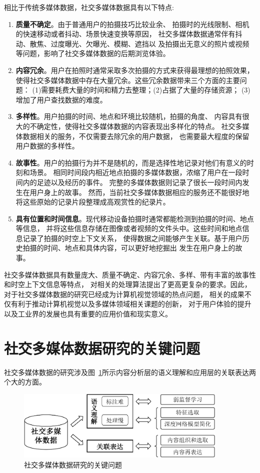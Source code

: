 \documentclass[doctor]{ustcthesis}
\begin{document}
相比于传统多媒体数据，社交多媒体数据具有以下特点:
\vspace{-0.2em}
\begin{enumerate}\setlength{\itemsep}{0pt}
    \item \textbf{质量不确定}。由于普通用户的拍摄技巧比较业余、
        拍摄时的光线限制、相机的快速移动或者抖动、场景快速变换等原因，
        社交多媒体数据通常伴有抖动、散焦、过度曝光、欠曝光、模糊、遮挡以
        及拍摄出无意义的照片或视频等问题，影响了社交多媒体数据的后期浏览体验。
    \item \textbf{内容冗余}。用户在拍照时通常采取多次拍摄的方式来获得最理想的拍照效果，
        使得社交多媒体数据中存在大量冗余。这些冗余数据带来三个方面的主要问题：
        (1)需要耗费大量的时间和精力去整理；(2)占据了大量的存储资源；
        (3)增加了用户查找数据的难度。
    \item \textbf{多样性}。用户拍摄的时间、地点和环境比较随机，拍摄的角度、
        内容具有很大的不确定性，使得社交多媒体数据的内容表现出多样化的特点。
        社交多媒体数据相关的服务，不仅需要去除冗余的用户数据，
        也需要最大程度的保留用户数据的多样性。
    \item \textbf{故事性}。用户的拍摄行为并不是随机的，而是选择性地记录对他们有意义的时刻和场景。
        相同时间段内相近地点拍摄的多媒体数据，浓缩了用户在一段时间内的足迹以及经历的事件。
        完整的多媒体数据则记录了很长一段时间内发生在用户身上的故事。
        然而，当前社交多媒体数据相应的服务还不能很好地将这些原始的记录片段整理成高观赏性的纪录片。
    \item \textbf{具有位置和时间信息}。现代移动设备拍摄时通常都能检测到拍摄的时间、地点等信息，
        并将这些信息存储在图像或者视频的文件头中。这些时间和地点信息记录了拍摄的时空上下文关系，
        使得数据之间能够产生关联。基于用户历史拍摄的时间、地点和具体内容，可以更好地挖掘出
        发生在用户身上的故事。
\end{enumerate}

社交多媒体数据具有数量庞大、质量不确定、内容冗余、多样、带有丰富的故事性和时空上下文信息等特点，
对相关的处理算法提出了更高更复杂的要求。因此，对于社交多媒体数据的研究已经成为计算机视觉领域的热点问题，
相关的成果不仅有利于推动计算机视觉以及多媒体领域相关课题的创新，
对于用户体验的提升以及工业界的发展也具有重要的应用价值和现实意义。

\section{社交多媒体数据研究的关键问题}
\label{sec:key_problems}
社交多媒体数据的研究涉及图~\ref{fig:key-problems}所示内容分析层的语义理解和应用层的关联表达两个大的方面。
\begin{figure}[ht]
\centering
\includegraphics[width=0.9\textwidth]{key-problems.pdf}
\caption{社交多媒体数据研究的关键问题}
\label{fig:key-problems}
\end{figure}
\end{document}
